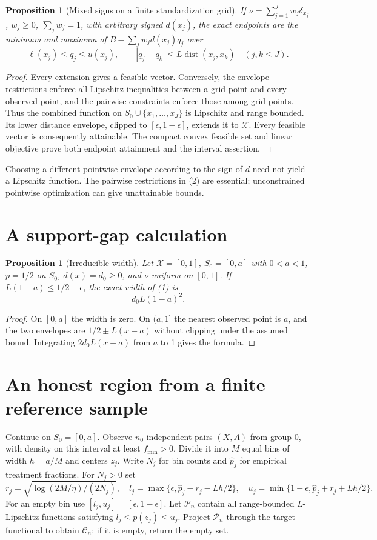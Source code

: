 \documentclass[11pt,a4paper]{article}
\newtheorem{proposition}[theorem]{Proposition}
\theoremstyle{definition}
\theoremstyle{remark}
\begin{document}
\begin{proposition}[Mixed signs on a finite standardization grid]
If $\nu=\sum_{j=1}^J w_j\delta_{x_j}$, $w_j\geq0$, $\sum_jw_j=1$, with arbitrary signed $d(x_j)$, the exact endpoints are the minimum and maximum of
$B-\sum_jw_jd(x_j)q_j$ over
\[
 \ell(x_j)\leq q_j\leq u(x_j),\qquad
 |q_j-q_k|\leq L\operatorname{dist}(x_j,x_k)\quad(j,k\leq J).\tag{2}
\]
\end{proposition}
\begin{proof}
Every extension gives a feasible vector. Conversely, the envelope restrictions enforce all Lipschitz inequalities between a grid point and every observed point, and the pairwise constraints enforce those among grid points. Thus the combined function on $S_0\cup\{x_1,\ldots,x_J\}$ is Lipschitz and range bounded. Its lower distance envelope, clipped to $[\epsilon,1-\epsilon]$, extends it to $\mathcal X$. Every feasible vector is consequently attainable. The compact convex feasible set and linear objective prove both endpoint attainment and the interval assertion.
\end{proof}

Choosing a different pointwise envelope according to the sign of $d$ need not yield a Lipschitz function. The pairwise restrictions in (2) are essential; unconstrained pointwise optimization can give unattainable bounds.

\section{A support-gap calculation}
\begin{proposition}[Irreducible width]
Let $\mathcal X=[0,1]$, $S_0=[0,a]$ with $0<a<1$, $p=1/2$ on $S_0$, $d(x)=d_0\geq0$, and $\nu$ uniform on $[0,1]$. If $L(1-a)\leq1/2-\epsilon$, the exact width of (1) is
\[
 d_0 L(1-a)^2.
\]
\end{proposition}
\begin{proof}
On $[0,a]$ the width is zero. On $(a,1]$ the nearest observed point is $a$, and the two envelopes are $1/2\pm L(x-a)$ without clipping under the assumed bound. Integrating $2d_0L(x-a)$ from $a$ to 1 gives the formula.
\end{proof}

\section{An honest region from a finite reference sample}
Continue on $S_0=[0,a]$. Observe $n_0$ independent pairs $(X,A)$ from group 0, with density on this interval at least $f_{\min}>0$. Divide it into $M$ equal bins of width $h=a/M$ and centers $z_j$. Write $N_j$ for bin counts and $\widehat p_j$ for empirical treatment fractions. For $N_j>0$ set
\[
 r_j=\sqrt{\log(2M/\eta)/(2N_j)},\quad
 l_j=\max\{\epsilon,\widehat p_j-r_j-Lh/2\},\quad
 u_j=\min\{1-\epsilon,\widehat p_j+r_j+Lh/2\}.
\]
For an empty bin use $[l_j,u_j]=[\epsilon,1-\epsilon]$. Let $\mathcal P_n$ contain all range-bounded $L$-Lipschitz functions satisfying $l_j\leq p(z_j)\leq u_j$. Project $\mathcal P_n$ through the target functional to obtain $\mathcal C_n$; if it is empty, return the empty set.
\end{document}
